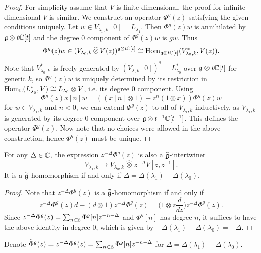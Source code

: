 \begin{proof}
  For simplicity assume that $V$ is finite-dimensional,
  the proof for infinite-dimensional $V$ is similar.
  We construct an operator $\Phi^g(z)$ satisfying the
  given conditions uniquely.
  Let $w \in V_{\lambda_1, k}[0] = L_{\lambda_1}$.
  Then $\Phi^g(z) w$ is annihilated by
  $\mathfrak{g} \otimes t \mathbb{C}[t]$ and the degree $0$ component
  of $\Phi^g(z) w$ is $gw$. Thus
  \[
    \Phi^g(z) w
    \in (V_{\lambda_0, k} \, \widehat{\otimes} \, V(z))^{\mathfrak{g} \otimes t \mathbb{C}[t]}
    \cong \operatorname{Hom}_{\mathfrak{g} \otimes t \mathbb{C}[t]}(V_{\lambda_0, k}^*, V(z)).
  \]
  Note that $V_{\lambda_0, k}^*$ is freely
  generated by $(V_{\lambda, k}[0])^* = L_{\lambda_0}^*$
  over $\mathfrak{g} \otimes t \mathbb{C}[t]$ for generic $k$, so
  $\Phi^g(z) w$ is uniquely determined by its
  restriction in
  $\operatorname{Hom}_{\mathbb{C}}(L_{\lambda_0}^*, V) \cong L_{\lambda_0} \otimes V$, i.e.
  its degree $0$ component.
  Using
  \[
    \Phi^g(z) x[n] w = ((x[n] \otimes 1) + z^n(1 \otimes x)) \Phi^g(z) w
  \]
  for $w \in V_{\lambda_1, k}$ and $n < 0$,
  we can extend $\Phi^g(z)$ to all of $V_{\lambda_1, k}$
  inductively, as $V_{\lambda_1, k}$ is generated by
  its degree $0$ component over
  $\mathfrak{g} \otimes t^{-1} \mathbb{C}[t^{-1}]$.
  This defines the operator $\Phi^g(z)$.
  Now note that no choices were allowed in the
  above construction, hence $\Phi^g(z)$ must be unique.
\end{proof}

\begin{prop}
  For any $\Delta \in \mathbb{C}$, the expression
  $z^{-\Delta} \Phi^g(z)$ is also a
  $\widehat{\mathfrak{g}}$-intertwiner
  \[V_{\lambda_1, k} \longrightarrow V_{\lambda_0, k} \, \widehat{\otimes} \, z^{-\Delta} V[z, z^{-1}].\]
  It is a $\widetilde{\mathfrak{g}}$-homomorphism if and only if
  $\Delta = \Delta(\lambda_1) - \Delta(\lambda_0)$.
\end{prop}

\begin{proof}
  Note that $z^{-\Delta} \Phi^g(z)$ is a
  $\widetilde{\mathfrak{g}}$-homomorphism if and only if
  \[
    z^{-\Delta} \Phi^g(z) d
    - (d \otimes 1) z^{-\Delta} \Phi^g(z)
    = \bigg(1 \otimes z \frac{d}{dz}\bigg)
    z^{-\Delta} \Phi^g(z).
  \]
  Since $z^{-\Delta} \Phi^g(z) = \sum_{n \in \mathbb{Z}} \Phi^g[n] z^{-n - \Delta}$
  and $\Phi^g[n]$ has degree $n$, it suffices
  to have the above identity in degree $0$,
  which is given by $-\Delta(\lambda_1) + \Delta(\lambda_0) = - \Delta$.
\end{proof}

\begin{remark}
  Denote $\widetilde{\Phi}^g(z) = z^{-\Delta} \Phi^g(z) = \sum_{n \in \mathbb{Z}} \Phi^g[n] z^{-n - \Delta}$
  for $\Delta = \Delta(\lambda_1) - \Delta(\lambda_0)$.
\end{remark}

